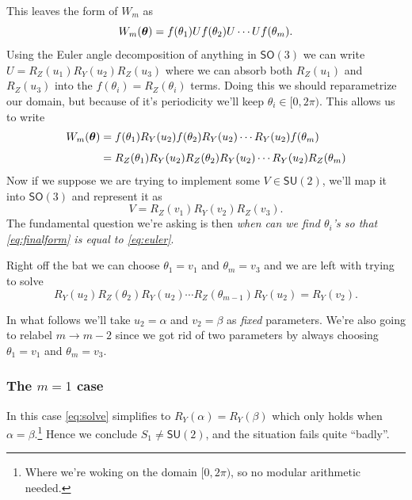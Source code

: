 \documentclass[12pt,dvipsnames]{article}
\newcommand{\SU}[1]{\mathsf{SU} (#1)}
\newcommand{\SO}[1]{\mathsf{SO} (#1)}
\newcommand{\1}{\mathbb{1}}
\theoremstyle{plain}
\begin{document}
This leaves the form of $W_m$ as
\begin{equation}
    W_m(\vb*{\theta}) = f(\theta_1)U f(\theta_2) U \cdots U f(\theta_m).
\end{equation}
Using the Euler angle decomposition of anything in $\SO{3}$ we can write $U = R_Z(u_1)R_Y(u_2)R_Z(u_3)$ where we can absorb both $R_Z(u_1)$ and $R_Z(u_3)$ into the $f(\theta_i) = R_Z(\theta_i)$ terms. Doing this we should reparametrize our domain, but because of it's periodicity we'll keep $\theta_i\in[0, 2\pi)$. %
This allows us to write
\begin{align}
    W_m(\vb*{\theta}) & = f(\theta_1)R_Y(u_2)f(\theta_2)R_Y(u_2)\cdots R_Y(u_2)f(\theta_m) \nonumber                  \\[0.4em]
                      & = R_Z(\theta_1)R_Y(u_2)R_Z(\theta_2)R_Y(u_2)\cdots R_Y(u_2)R_Z(\theta_m) \label{eq:finalform}
\end{align}
Now if we suppose we are trying to implement some $V\in\SU{2}$, we'll map it into $\SO{3}$ and represent it as
\begin{equation}\label{eq:euler}
    V = R_Z(v_1)R_Y(v_2)R_Z(v_3).
\end{equation}
The fundamental question we're asking is then \emph{when can we find $\theta_i$'s so that \cref{eq:finalform} is equal to \cref{eq:euler}}.

Right off the bat we can choose $\theta_1 = v_1$ and $\theta_m = v_3$ and we are left with trying to solve
\begin{equation}\label{eq:solve}
    R_Y(u_2)R_Z(\theta_2)R_Y(u_2)\cdots R_Z(\theta_{m - 1})R_Y(u_2) = R_Y(v_2).
\end{equation}

In what follows we'll take $u_2 = \alpha$ and $v_2 = \beta$ as \emph{fixed} parameters. We're also going to relabel $m\to m - 2$ since we got rid of two parameters by always choosing $\theta_1 = v_1$ and $\theta_m = v_3$.


\subsubsection{The $m = 1$ case}
In this case \cref{eq:solve} simplifies to $R_Y(\alpha) = R_Y(\beta)$ which only holds when $\alpha = \beta$.\footnote{Where we're woking on the domain $[0, 2\pi)$, so no modular arithmetic needed.} Hence we conclude $S_1\neq \SU{2}$, and the situation fails quite ``badly''. %
\end{document}
